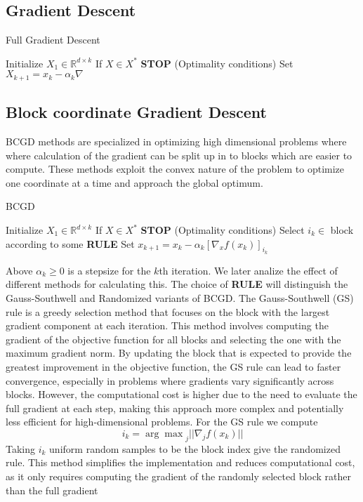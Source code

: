 \documentclass{article}
\begin{document}
\subsection{Gradient Descent}
\begin{algorithm}
\caption{Full Gradient Descent}\label{alg:cap}
\begin{algorithmic}
\State Initialize $X_1 \in \mathbb{R}^{d\times k}$
    \State If $X \in X^*$ \textbf{STOP} (Optimality conditions)
    \State Set $X_{k+1} = x_k - \alpha_{k}\nabla$
\EndFor
\end{algorithmic}
\end{algorithm}

\subsection{Block coordinate Gradient Descent}
BCGD methods are specialized in optimizing high dimensional problems where where calculation of the gradient can be split up in to blocks which are easier to compute. These methods exploit the convex nature of the problem to optimize one coordinate at a time and approach the global optimum.
\begin{algorithm}
\caption{BCGD}\label{alg:cap}
\begin{algorithmic}
\State Initialize $X_1 \in \mathbb{R}^{d\times k}$
    \State If $X \in X^*$ \textbf{STOP} (Optimality conditions)
    \State Select $i_k \in $ block according to some \textbf{RULE}
    \State Set $x_{k+1} = x_k - \alpha_k[\nabla_x f(x_k)]_{i_k}$
\EndFor
\end{algorithmic}
\end{algorithm}
Above $\alpha_k \geq 0$ is a stepsize for the $k$th iteration. We later analize the effect of different methods for calculating this. The choice of \textbf{RULE} will distinguish the Gauss-Southwell and Randomized variants of BCGD. The Gauss-Southwell (GS) rule is a greedy selection method that focuses on the block with the largest gradient component at each iteration. This method involves computing the gradient of the objective function for all blocks and selecting the one with the maximum gradient norm. By updating the block that is expected to provide the greatest improvement in the objective function, the GS rule can lead to faster convergence, especially in problems where gradients vary significantly across blocks. However, the computational cost is higher due to the need to evaluate the full gradient at each step, making this approach more complex and potentially less efficient for high-dimensional problems.
For the GS rule we compute 
$$i_k = {\arg\max}_j ||\nabla_j f(x_k)||$$
Taking $i_k$ uniform random samples to be the block index give the randomized rule. This method simplifies the implementation and reduces computational cost, as it only requires computing the gradient of the randomly selected block rather than the full gradient
 
\end{document}
